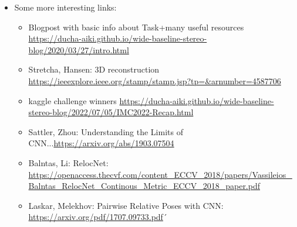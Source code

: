 \documentclass{article}
\begin{document}
\begin{itemize}
\item Some more interesting links:
\begin{itemize}
\item Blogpost with basic info about Task+many useful resources \url{https://ducha-aiki.github.io/wide-baseline-stereo-blog/2020/03/27/intro.html}
\item Stretcha, Hansen: 3D reconstruction \url{https://ieeexplore.ieee.org/stamp/stamp.jsp?tp=&arnumber=4587706}
\item kaggle challenge winners \url{https://ducha-aiki.github.io/wide-baseline-stereo-blog/2022/07/05/IMC2022-Recap.html}
\item Sattler, Zhou: Understanding the Limits of CNN...\url{https://arxiv.org/abs/1903.07504}
\item Balntas, Li: RelocNet: \url{https://openaccess.thecvf.com/content_ECCV_2018/papers/Vassileios_Balntas_RelocNet_Continous_Metric_ECCV_2018_paper.pdf}
\item Laskar, Melekhov: Pairwise Relative Poses with CNN: \url{https://arxiv.org/pdf/1707.09733.pdf}´
\end{itemize}

\end{itemize}
\end{document}
